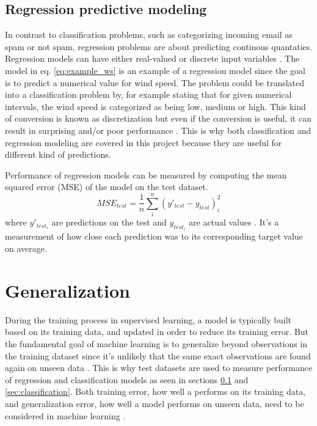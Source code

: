 	\subsection{Regression predictive modeling} \label{sec:regression}
	In contrast to classification problems, such as categorizing incoming email as spam or not spam, regression problems are about predicting continous quantaties. Regression models can have either real-valued or discrete input variables \cite{WEBSITE:8}. The model in eq. \ref{eq:example_ws} is an example of a regression model since the goal is to predict a numerical value for wind speed. The problem could be translated into a classification problem by, for example stating that for given numerical intervals, the wind speed is categorized as being low, medium or high. This kind of conversion is known as discretization but even if the conversion is useful, it can result in surprising and/or poor performance \cite{WEBSITE:8}. This is why both classification and regression modeling are covered in this project because they are useful for different kind of predictions.

	Performance of regression models can be measured by computing the mean squared error (MSE) of the model on the test dataset. 
\begin{equation}
	MSE_{test} = \frac{1}{n} \sum_{i}^{n}(y'_{test} - y_{test})_{i}^2
\end{equation}
where $y'_{test_i}$ are predictions on the test and $y_{test_i}$ are actual values \cite{BOOK:1}. It's a measurement of how close each prediction was to its corresponding target value on average.

\section{Generalization}
	During the training process in supervised learning, a model is typically built based on its training data, and updated in order to reduce its training error. But the fundamental goal of machine learning is to generalize beyond observations in the training dataset since it's unlikely that the same exact observations are found again on unseen data \cite{ARTICLE:3}. This is why test datasets are used to measure performance of regression and classification models as seen in sections \ref{sec:regression} and \ref{sec:classification}. Both training error, how well a performs on its training data, and generalization error, how well a model performs on unseen data, need to be considered in machine learning \cite{BOOK:1}.


